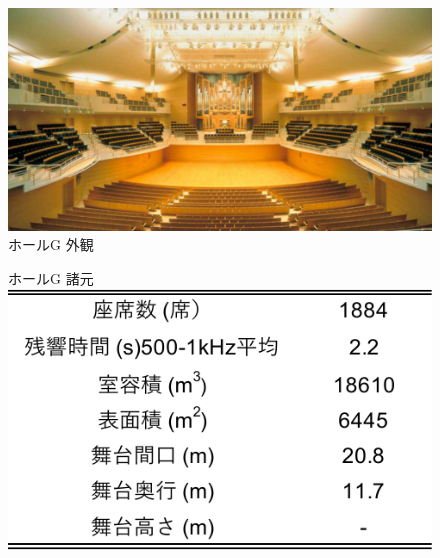 \documentclass[11pt,a4j]{jreport}
\begin{document}
\begin{figure}[H]
  \begin{minipage}{0.5\textwidth} %
    \centering

    \includegraphics[width=.8\linewidth]{images/measuredHalls/resized/picture_g.jpg}
    \\ホールG 外観
    \vspace{2\baselineskip}

    ホールG 諸元\\
    \includegraphics[width=.8\linewidth]{images/measuredHalls/informationTable/g.pdf}
    \vspace{2\baselineskip}


\end{minipage}
\end{figure}
\end{document}
